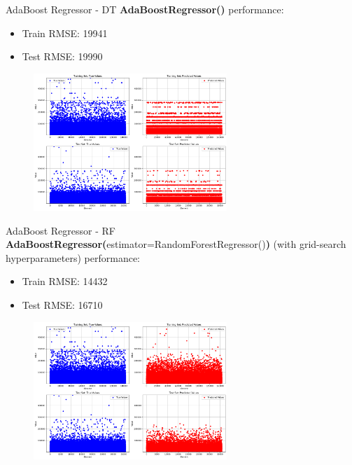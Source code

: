 \documentclass{beamer}
\begin{document}
\begin{frame}{AdaBoost Regressor - DT}
\textbf{AdaBoostRegressor()} performance:
        \begin{itemize}
            \item Train RMSE: 19941
            \item Test RMSE: 19990
        \end{itemize}
    \begin{figure}
        \centering
        \includegraphics[width=0.65\textwidth]{images/AdaBR_default_plot2.png}
    \end{figure}
\end{frame}

\begin{frame}{AdaBoost Regressor - RF}
\textbf{AdaBoostRegressor(}estimator=RandomForestRegressor()\textbf{)} (with grid-search hyperparameters) performance:
        \begin{itemize}
            \item Train RMSE: 14432
            \item Test RMSE: 16710
        \end{itemize}
    \begin{figure}
        \centering
        \includegraphics[width=0.65\textwidth]{images/AdaBR_RF_plot2.png}
    \end{figure}
\end{frame}
\end{document}
